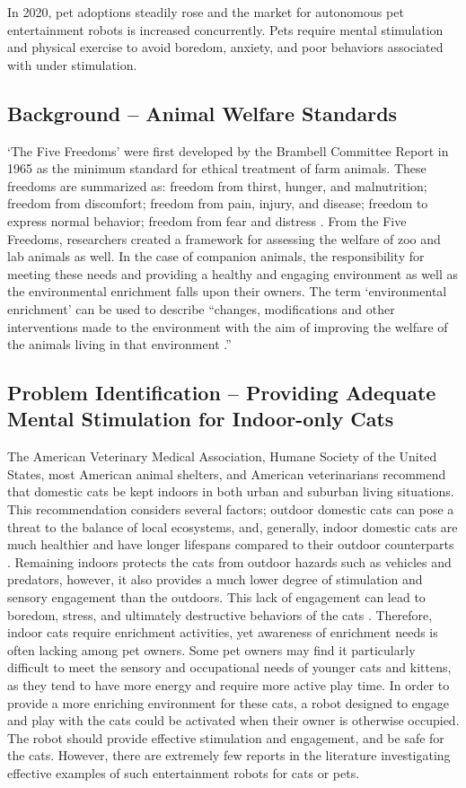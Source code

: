In 2020, pet adoptions steadily rose and the market for autonomous pet entertainment robots is increased concurrently. Pets require mental stimulation and physical exercise to avoid boredom, anxiety, and poor behaviors associated with under stimulation. 

\subsection {Background – Animal Welfare Standards}
‘The Five Freedoms’ were first developed by the Brambell Committee Report in 1965 as the minimum standard for ethical treatment of farm animals. These freedoms are summarized as:
freedom from thirst, hunger, and malnutrition; freedom from discomfort; freedom from pain, injury, and disease; freedom to express normal behavior; freedom from fear and distress \cite{Brambell1965ReportOT}.
   From the Five Freedoms, researchers created a framework for assessing the welfare of zoo and lab animals as well. In the case of companion animals, the responsibility for meeting these needs and providing a healthy and engaging environment as well as the environmental enrichment falls upon their owners. The term ‘environmental enrichment’ can be used to describe “changes, modifications and other interventions made to the environment with the aim of improving the welfare of the animals living in that environment \cite{rochlitz2005review}.”

\subsection {Problem Identification – Providing Adequate Mental Stimulation for Indoor-only Cats}
The American Veterinary Medical Association, Humane Society of the United States, most American animal shelters, and American veterinarians recommend that domestic cats be kept indoors in both urban and suburban living situations. This recommendation considers several factors; outdoor domestic cats can pose a threat to the balance of local ecosystems, and, generally, indoor domestic cats are much healthier and have longer lifespans compared to their outdoor counterparts \cite{rochlitz2005review}. Remaining indoors protects the cats from outdoor hazards such as vehicles and predators, however, it also provides a much lower degree of stimulation and sensory engagement than the outdoors. This lack of engagement can lead to boredom, stress, and ultimately destructive behaviors of the cats \cite{wells2009sensory}. Therefore, indoor cats require enrichment activities, yet awareness of enrichment needs is often lacking among pet owners.
  Some pet owners may find it particularly difficult to meet the sensory and occupational needs of younger cats and kittens, as they tend to have more energy and require more active play time. In order to provide a more enriching environment for these cats, a robot designed to engage and play with the cats could be activated when their owner is otherwise occupied. The robot should provide effective stimulation and engagement, and be safe for the cats. However, there are extremely few reports in the literature investigating effective examples of such entertainment robots for cats or pets. 


